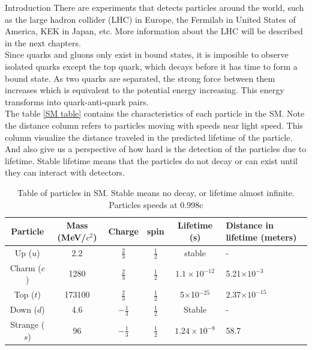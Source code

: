 \begin{chapter}{Introduction}
There are experiments that detects particles around the world, such as the large hadron collider (LHC) in Europe, the Fermilab in United States of America, KEK in Japan, etc. More information about the LHC will be described in the next chapters.
\\
Since quarks and gluons only exist in bound states, it is imposible to observe isolated quarks except the top quark, which decays before it has time to form a
bound state. As two quarks are separated, the strong force between them increases
which is equivalent to the potential energy increasing. This energy transforms into
quark-anti-quark pairs. \\

The table \ref{SM table} contains the characteristics of each particle in the SM. Note the distance column refers to particles moving with speeds near light speed. This column visualize the distance traveled in the predicted lifetime of the particle. And also give us a perspective of how hard is the detection of the particles due to lifetime. Stable lifetime means that the particles do not decay or can exist until they can interact with detectors. \\

\begin{table}[!htbp]
\caption{Table of particles in SM\cite{pd}. Stable means no decay, or lifetime almost infinite. Particles speeds at 0.998c}
\renewcommand{\arraystretch}{1.5}
\begin{tabular}{|c|c|c|c|c|p{2.5cm}|}
\hline 
Particle	& Mass (MeV/$c^2$) &Charge & spin &Lifetime (s) & Distance in lifetime (meters) \\ 
	\hline 
Up ($u$)	& 2.2 & $\frac{2}{3}$ & $\frac{1}{2}$ & stable & -\\ 
	\hline 
Charm ($c$)	& 1280 &$\frac{2}{3}$ & $\frac{1}{2}$ & $ 1.1 \times 10^{-12}$ & 5.21$\times 10^{-3}$ \\ 
	\hline 
Top	($t$)& 173100 & $\frac{2}{3}$ & $\frac{1}{2}$ & 5$\times$10$^{-25}$ &2.37$\times 10^{-15}$  \\ 
	\hline 
Down ($d$)	& 4.6 &$-\frac{1}{3}$ & $\frac{1}{2}$ & Stable & - \\ 
	\hline 
Strange ($s$)	& 96 &$-\frac{1}{3}$ & $\frac{1}{2}$ &$1.24 \times 10^{-8}$ & 58.7 \\ 
	\hline 


\end{tabular}
\end{table}
\end{chapter}
